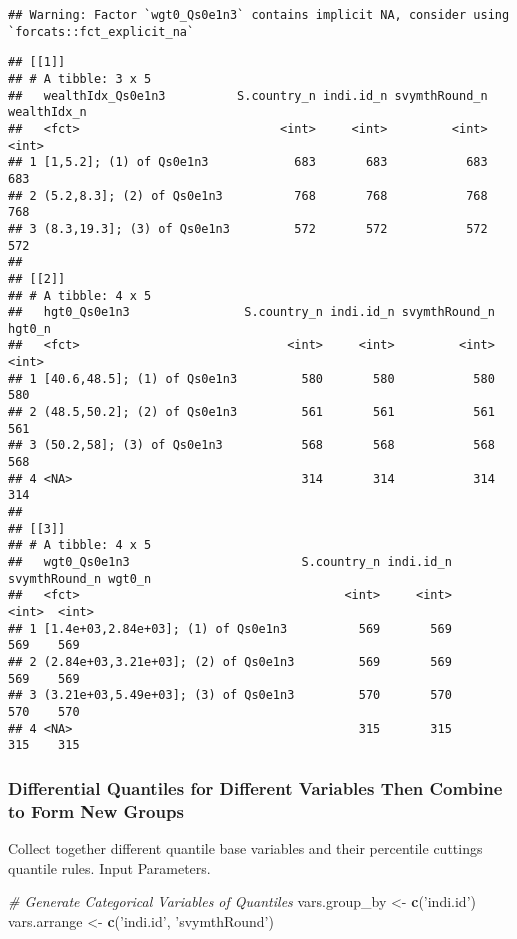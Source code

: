\documentclass[
]{book}
\newenvironment{Shaded}{\begin{snugshade}}{\end{snugshade}}
\newcommand{\CommentTok}[1]{\textcolor[rgb]{0.56,0.35,0.01}{\textit{#1}}}
\newcommand{\KeywordTok}[1]{\textcolor[rgb]{0.13,0.29,0.53}{\textbf{#1}}}
\newcommand{\NormalTok}[1]{#1}
\newcommand{\StringTok}[1]{\textcolor[rgb]{0.31,0.60,0.02}{#1}}
\begin{document}
\begin{verbatim}
## Warning: Factor `wgt0_Qs0e1n3` contains implicit NA, consider using `forcats::fct_explicit_na`
\end{verbatim}

\begin{verbatim}
## [[1]]
## # A tibble: 3 x 5
##   wealthIdx_Qs0e1n3          S.country_n indi.id_n svymthRound_n wealthIdx_n
##   <fct>                            <int>     <int>         <int>       <int>
## 1 [1,5.2]; (1) of Qs0e1n3            683       683           683         683
## 2 (5.2,8.3]; (2) of Qs0e1n3          768       768           768         768
## 3 (8.3,19.3]; (3) of Qs0e1n3         572       572           572         572
## 
## [[2]]
## # A tibble: 4 x 5
##   hgt0_Qs0e1n3                S.country_n indi.id_n svymthRound_n hgt0_n
##   <fct>                             <int>     <int>         <int>  <int>
## 1 [40.6,48.5]; (1) of Qs0e1n3         580       580           580    580
## 2 (48.5,50.2]; (2) of Qs0e1n3         561       561           561    561
## 3 (50.2,58]; (3) of Qs0e1n3           568       568           568    568
## 4 <NA>                                314       314           314    314
## 
## [[3]]
## # A tibble: 4 x 5
##   wgt0_Qs0e1n3                        S.country_n indi.id_n svymthRound_n wgt0_n
##   <fct>                                     <int>     <int>         <int>  <int>
## 1 [1.4e+03,2.84e+03]; (1) of Qs0e1n3          569       569           569    569
## 2 (2.84e+03,3.21e+03]; (2) of Qs0e1n3         569       569           569    569
## 3 (3.21e+03,5.49e+03]; (3) of Qs0e1n3         570       570           570    570
## 4 <NA>                                        315       315           315    315
\end{verbatim}

\hypertarget{differential-quantiles-for-different-variables-then-combine-to-form-new-groups}{%
\subsubsection{Differential Quantiles for Different Variables Then Combine to Form New Groups}\label{differential-quantiles-for-different-variables-then-combine-to-form-new-groups}}

Collect together different quantile base variables and their percentile cuttings quantile rules. Input Parameters.

\begin{Shaded}
\begin{Highlighting}[]
\CommentTok{# Generate Categorical Variables of Quantiles}
\NormalTok{vars.group_by <-}\StringTok{ }\KeywordTok{c}\NormalTok{(}\StringTok{'indi.id'}\NormalTok{)}
\NormalTok{vars.arrange <-}\StringTok{ }\KeywordTok{c}\NormalTok{(}\StringTok{'indi.id'}\NormalTok{, }\StringTok{'svymthRound'}\NormalTok{)}
\end{Highlighting}
\end{Shaded}
\end{document}
